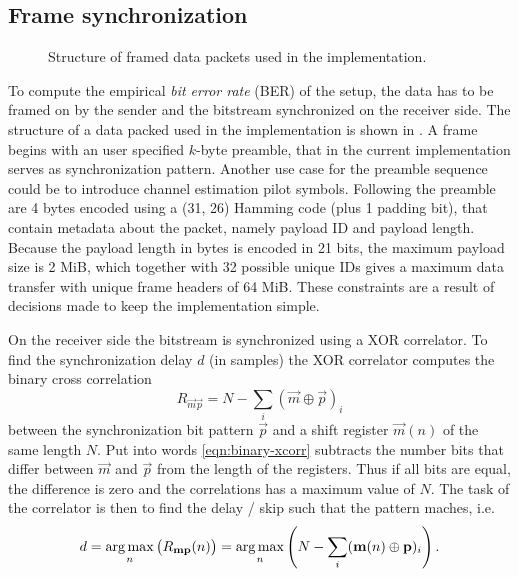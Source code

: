 \subsection{Frame synchronization}

\begin{figure}
	\centering
	
	\caption{
		Structure of framed data packets used in the implementation.
		\label{fig:dataframe}
	}
\end{figure}

To compute the empirical \emph{bit error rate} (BER) of the setup, the data has to be framed on by the sender and the bitstream synchronized on the receiver side. The structure of a data packed used in the implementation is shown in . A frame begins with an user specified \(k\)-byte preamble, that in the current implementation serves as synchronization pattern. Another use case for the preamble sequence could be to introduce channel estimation pilot symbols. Following the preamble are 4 bytes encoded using a (31, 26) Hamming code (plus 1 padding bit), that contain metadata about the packet, namely payload ID and payload length. Because the payload length in bytes is encoded in 21 bits, the maximum payload size is 2 MiB, which together with 32 possible unique IDs gives a maximum data transfer with unique frame headers of 64 MiB. These constraints are a result of decisions made to keep the implementation simple.

On the receiver side the bitstream is synchronized using a XOR correlator. To find the synchronization delay \(d\) (in samples) the XOR correlator computes the binary cross correlation
\begin{equation} \label{eqn:binary-xcorr}
	R_{\vec{m}\vec{p}} = N - \sum_i (\vec{m} \oplus \vec{p})_i
\end{equation}
between the synchronization bit pattern \(\vec{p}\) and a shift register \(\vec{m}(n)\) of the same length \(N\). Put into words \eqref{eqn:binary-xcorr} subtracts the number bits that differ between \(\vec{m}\) and \(\vec{p}\) from the length of the registers. Thus if all bits are equal, the difference is zero and the correlations has a maximum value of \(N\). The task of the correlator is then to find the delay / skip such that the pattern maches, i.e.
\begin{equation}
	d = \operatorname*{arg\,max}_n \big( R_{\mathbf{\bm{m}}\mathbf{\bm{p}}}(n) \big)
		= \operatorname*{arg\,max}_n \left( N - \sum_i (\mathbf{\bm{m}}(n) \oplus \mathbf{\bm{p}})_i \right)
	.
\end{equation}

